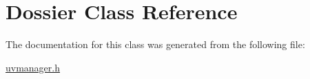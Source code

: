 \hypertarget{class_dossier}{\section{Dossier Class Reference}
\label{class_dossier}
}


The documentation for this class was generated from the following file\+:\begin{DoxyCompactItemize}
\item 
\hyperlink{uvmanager_8h}{uvmanager.\+h}\end{DoxyCompactItemize}
